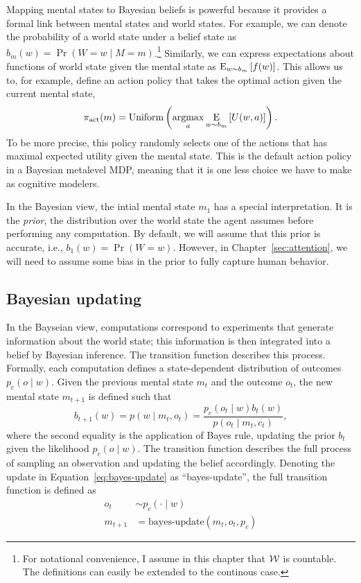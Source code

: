 Mapping mental states to Bayesian beliefs is powerful because it provides a formal link between mental states and world states. For example, we can denote the probability of a world state under a belief state as $b_m(w) = \Pr(W = w \mid M = m)$.\footnote{%
  For notational convenience, I assume in this chapter that $\W$ is countable. The definitions can easily be extended to the continous case.
} Similarly, we can express expectations about functions of world state given the mental state as $\expectunder{f(w)}{w \sim b_m}$. This allows us to, for example, define an action policy that takes the optimal action given the current mental state,
\begin{equation}
  \pi\act(m) = \Uniform \left(\argmax_a \expectunder{U(w, a)}{w \sim b_m}\right).
\end{equation}
%
To be more precise, this policy randomly selects one of the actions that has maximal expected utility given the mental state. This is the default action policy in a Bayesian metalevel MDP, meaning that it is one less choice we have to make as cognitive modelers.

In the Bayesian view, the intial mental state $m_1$ has a special interpretation. It is the \emph{prior}, the distribution over the world state the agent assumes before performing any computation. By default, we will assume that this prior is accurate, i.e., $b_1(w) = \Pr(W=w)$. However, in Chapter~\ref{sec:attention}, we will need to assume some bias in the prior to fully capture human behavior.

\subsection{Bayesian updating}

In the Bayseian view, computations correspond to experiments that generate information about the world state; this information is then integrated into a belief by Bayesian inference. The transition function describes this process. Formally, each computation defines a state-dependent distribution of outcomes $p_c(o \mid w)$. Given the previous mental state $m_t$ and the outcome $o_t$, the new mental state $m_{t+1}$ is defined such that
%
\begin{equation}\label{eq:bayes-update}
  b_{t+1}(w) = p(w \mid m_t, o_t) = \frac{
    p_c(o_t \mid w) b_t(w) 
  }{
    p(o_t \mid m_t, c_t)
  },
\end{equation}
%
where the second equality is the application of Bayes rule, updating the prior $b_t$ given the likelihood $p_c(o \mid w)$. The transition function describes the full process of sampling an observation and updating the belief accordingly. Denoting the update in Equation~\ref{eq:bayes-update} as ``bayes-update'', the full transition function is defined as
%
\begin{equation}\label{eq:bayes-transition}
\begin{aligned}
  o_t &\sim p_c(\cdot \mid w) \\
  m_{t+1} &= \text{bayes-update}(m_t, o_t, p_c)
\end{aligned}
\end{equation}

